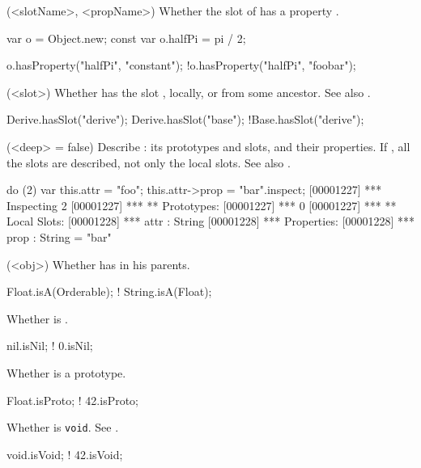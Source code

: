 \begin{urbiscriptapi}
\item[hasProperty](<slotName>, <propName>)%
  Whether the slot  of \this has a property .
\begin{urbiassert}
var o = Object.new;
const var o.halfPi = pi / 2;

 o.hasProperty("halfPi", "constant");
!o.hasProperty("halfPi", "foobar");
\end{urbiassert}

\item[hasSlot](<slot>)%
  Whether \this has the slot , locally, or from
  some ancestor.  See also .

\begin{urbiassert}
Derive.hasSlot("derive");
Derive.hasSlot("base");
!Base.hasSlot("derive");
\end{urbiassert}

\item['$id']%

\item[inspect](<deep> = false)%
  Describe \this: its prototypes and slots, and their
  properties.  If , all the slots are described, not only
  the local slots. See also .
\begin{urbiscript}
do (2) { var this.attr = "foo"; this.attr->prop = "bar"}.inspect;
[00001227] *** Inspecting 2
[00001227] *** ** Prototypes:
[00001227] ***   0
[00001227] *** ** Local Slots:
[00001228] ***   attr : String
[00001228] ***     Properties:
[00001228] ***      prop : String = "bar"
\end{urbiscript}

\item[isA](<obj>)%
  Whether \this has  in his parents.
\begin{urbiassert}
   Float.isA(Orderable);
! String.isA(Float);
\end{urbiassert}

\item[isNil]%
  Whether \this is .
\begin{urbiassert}
 nil.isNil;
!  0.isNil;
\end{urbiassert}

\item[isProto]%
  Whether \this is a prototype.
\begin{urbiassert}
 Float.isProto;
!   42.isProto;
\end{urbiassert}

\item[isVoid]%
  Whether \this is \lstinline|void|.  See .
\begin{urbiassert}
void.isVoid;
! 42.isVoid;
\end{urbiassert}


\end{urbiscriptapi}
